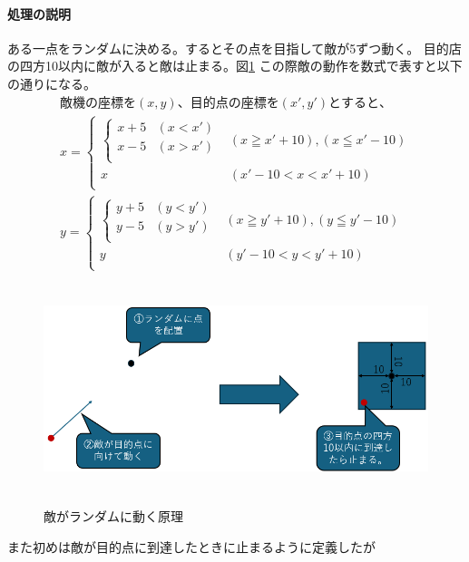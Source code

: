 \documentclass[a4paper,titlepage,11pt]{ltjsarticle}
\begin{document}
\paragraph{処理の説明}
ある一点をランダムに決める。するとその点を目指して敵が5ずつ動く。
目的店の四方10以内に敵が入ると敵は止まる。図\ref{random_move}
この際敵の動作を数式で表すと以下の通りになる。
\begin{gather*}
	敵機の座標を(x,y)、目的点の座標を(x',y')とすると、\\
	x = 
	\begin{cases}
		\begin{cases}
			x + 5 & (x < x') \\
			x - 5 & (x > x') \\
		\end{cases}
		& (x \geqq x' + 10),(x \leqq x' - 10) \\
		x & (x' -10 < x < x' + 10) \\
	\end{cases}
	\\
	y = 
	\begin{cases}
		\begin{cases}
			y + 5 & (y < y') \\
			y - 5 & (y > y') \\
		\end{cases}
		& (x \geqq y' + 10),(y \leqq y' - 10) \\
		y & (y' -10 < y < y' + 10) \\
	\end{cases}
\end{gather*}
\begin{figure}[H]
\begin{center}
\includegraphics*[height = 6cm]{random_move.png}
\label{random_move}
\caption{敵がランダムに動く原理}
\end{center}
\end{figure}
また初めは敵が目的点に到達したときに止まるように定義したが
\end{document}
